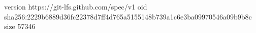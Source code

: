 version https://git-lfs.github.com/spec/v1
oid sha256:2229b6889d36fc22378d7ff4d765a5155148b739a1c6e3ba09970546a09b9b8c
size 57346
